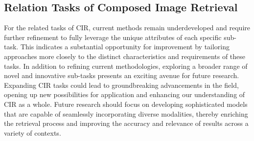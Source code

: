\subsection{Relation Tasks of Composed Image Retrieval}
For the related tasks of CIR, current methods remain underdeveloped and require further refinement to fully leverage the unique attributes of each specific sub-task. This indicates a substantial opportunity for improvement by tailoring approaches more closely to the distinct characteristics and requirements of these tasks. 
In addition to refining current methodologies, exploring a broader range of novel and innovative sub-tasks presents an exciting avenue for future research. Expanding CIR tasks could lead to groundbreaking advancements in the field, opening up new possibilities for application and enhancing our understanding of CIR as a whole. Future research should focus on developing sophisticated models that are capable of seamlessly incorporating diverse modalities, thereby enriching the retrieval process and improving the accuracy and relevance of results across a variety of contexts. 

